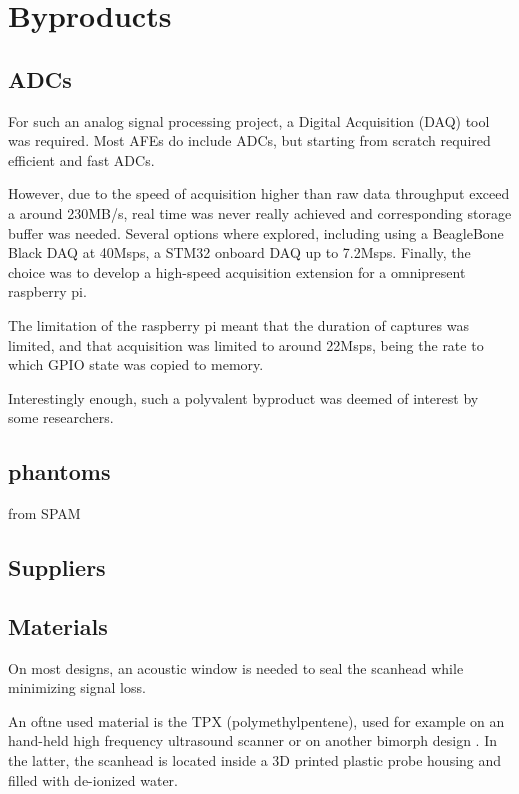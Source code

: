 \documentclass[conference]{IEEEtran}
\begin{document}
 
 
\section{Byproducts}

\subsection{ADCs}

For such an analog signal processing project, a Digital Acquisition (DAQ) tool was required. Most AFEs do include ADCs, but starting from scratch required efficient and fast ADCs. 

However, due to the speed of acquisition higher than raw data throughput exceed a around 230MB/s, real time was never really achieved and corresponding storage buffer was needed. Several options where explored, including using a BeagleBone Black DAQ at 40Msps, a STM32 onboard DAQ up to 7.2Msps. Finally, the choice was to develop a high-speed acquisition extension for a omnipresent raspberry pi.

The limitation of the raspberry pi meant that the duration of captures was limited, and that acquisition was limited to around 22Msps, being the rate to which GPIO state was copied to memory. 

Interestingly enough, such a polyvalent byproduct was deemed of interest by some researchers.



\subsection{phantoms}

\cite{nolting_inexpensive_2016} from SPAM

\subsection{Suppliers}


\subsection{Materials}


On most designs, an acoustic window is needed to seal the scanhead while minimizing signal loss.

An oftne used material is the TPX (polymethylpentene), used for example on an hand-held high frequency ultrasound scanner  \cite{erickson_hand-held_2001} or on another bimorph design \cite{brown_low_2013}. In the latter, the scanhead is located inside a 3D printed plastic probe housing and filled with de-ionized water.
\end{document}
